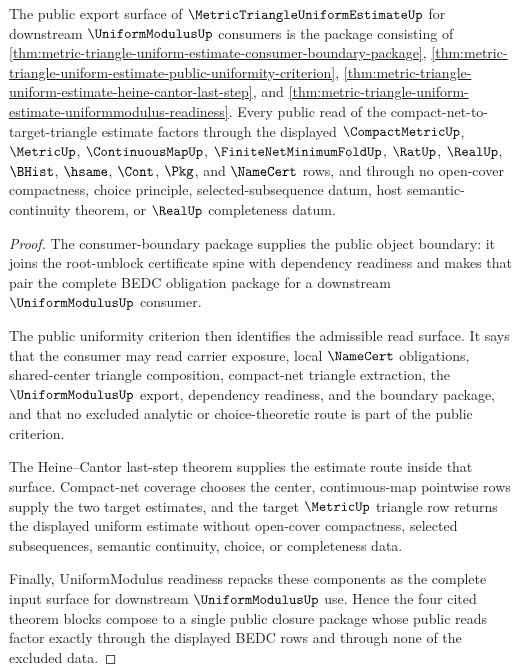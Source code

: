 \begin{theorem}
\label{thm:metric-triangle-uniform-estimate-public-closure-package}
The public export surface of $\MetricTriangleUniformEstimateUp$ for downstream $\UniformModulusUp$ consumers is the package consisting of \autoref{thm:metric-triangle-uniform-estimate-consumer-boundary-package}, \autoref{thm:metric-triangle-uniform-estimate-public-uniformity-criterion}, \autoref{thm:metric-triangle-uniform-estimate-heine-cantor-last-step}, and \autoref{thm:metric-triangle-uniform-estimate-uniformmodulus-readiness}. Every public read of the compact-net-to-target-triangle estimate factors through the displayed $\CompactMetricUp$, $\MetricUp$, $\ContinuousMapUp$, $\FiniteNetMinimumFoldUp$, $\RatUp$, $\RealUp$, $\BHist$, $\hsame$, $\Cont$, $\Pkg$, and $\NameCert$ rows, and through no open-cover compactness, choice principle, selected-subsequence datum, host semantic-continuity theorem, or $\RealUp$ completeness datum.
\end{theorem}
\begin{proof}
The consumer-boundary package supplies the public object boundary: it joins the root-unblock certificate spine with dependency readiness and makes that pair the complete BEDC obligation package for a downstream $\UniformModulusUp$ consumer.

The public uniformity criterion then identifies the admissible read surface. It says that the consumer may read carrier exposure, local $\NameCert$ obligations, shared-center triangle composition, compact-net triangle extraction, the $\UniformModulusUp$ export, dependency readiness, and the boundary package, and that no excluded analytic or choice-theoretic route is part of the public criterion.

The Heine--Cantor last-step theorem supplies the estimate route inside that surface. Compact-net coverage chooses the center, continuous-map pointwise rows supply the two target estimates, and the target $\MetricUp$ triangle row returns the displayed uniform estimate without open-cover compactness, selected subsequences, semantic continuity, choice, or completeness data.

Finally, UniformModulus readiness repacks these components as the complete input surface for downstream $\UniformModulusUp$ use. Hence the four cited theorem blocks compose to a single public closure package whose public reads factor exactly through the displayed BEDC rows and through none of the excluded data.
\end{proof}

